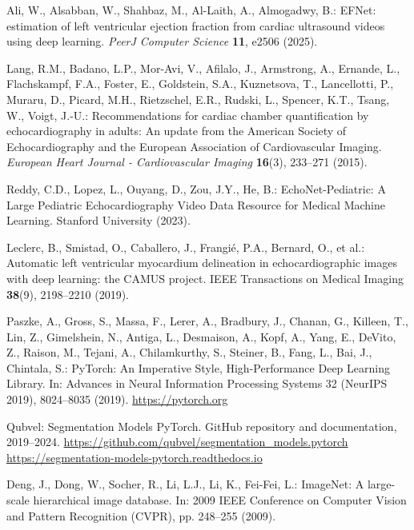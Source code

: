 \documentclass[runningheads]{llncs}
\begin{document}
\begin{thebibliography}{99}
Ali, W., Alsabban, W., Shahbaz, M., Al-Laith, A., Almogadwy, B.: EFNet: estimation of left ventricular ejection fraction from cardiac ultrasound videos using deep learning. \textit{PeerJ Computer Science} \textbf{11}, e2506 (2025). 

Lang, R.M., Badano, L.P., Mor-Avi, V., Afilalo, J., Armstrong, A., Ernande, L., Flachskampf, F.A., Foster, E., Goldstein, S.A., Kuznetsova, T., Lancellotti, P., Muraru, D., Picard, M.H., Rietzschel, E.R., Rudski, L., Spencer, K.T., Tsang, W., Voigt, J.-U.: Recommendations for cardiac chamber quantification by echocardiography in adults: An update from the American Society of Echocardiography and the European Association of Cardiovascular Imaging. \textit{European Heart Journal - Cardiovascular Imaging} \textbf{16}(3), 233--271 (2015). 

Reddy, C.D., Lopez, L., Ouyang, D., Zou, J.Y., He, B.: EchoNet-Pediatric: A Large Pediatric Echocardiography Video Data Resource for Medical Machine Learning. Stanford University (2023). 

Leclerc, B., Smistad, O., Caballero, J., Frangié, P.A., Bernard, O., et al.: Automatic left ventricular myocardium delineation in echocardiographic images with deep learning: the CAMUS project. IEEE Transactions on Medical Imaging \textbf{38}(9), 2198--2210 (2019). 

Paszke, A., Gross, S., Massa, F., Lerer, A., Bradbury, J., Chanan, G., Killeen, T., Lin, Z., Gimelshein, N., Antiga, L., Desmaison, A., Kopf, A., Yang, E., DeVito, Z., Raison, M., Tejani, A., Chilamkurthy, S., Steiner, B., Fang, L., Bai, J., Chintala, S.: PyTorch: An Imperative Style, High-Performance Deep Learning Library. In: Advances in Neural Information Processing Systems 32 (NeurIPS 2019), 8024--8035 (2019). \url{https://pytorch.org}

Qubvel: Segmentation Models PyTorch. GitHub repository and documentation, 2019--2024. \url{https://github.com/qubvel/segmentation_models.pytorch} \url{https://segmentation-models-pytorch.readthedocs.io}

Deng, J., Dong, W., Socher, R., Li, L.J., Li, K., Fei-Fei, L.: ImageNet: A large-scale hierarchical image database. In: 2009 IEEE Conference on Computer Vision and Pattern Recognition (CVPR), pp. 248--255 (2009). 


\end{thebibliography}
\end{document}
